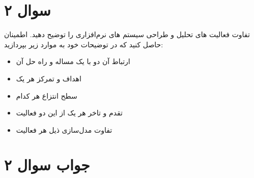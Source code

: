 \section*{سوال ۲}

تفاوت فعالیت های تحلیل و طراحی سیستم های نرم‌افزاری را توضیح دهید. اطمینان حاصل کنید که در توضیحات خود به موارد زیر بپردازید:

\begin{itemize}
	\item ارتباط آن دو با یک مساله و راه حل آن
	\item اهداف و تمرکز هر یک
	\item سطح انتزاع هر کدام
	\item تقدم و تاخر هر یک از این دو فعالیت
	\item تفاوت مدل‌سازی ذیل هر فعالیت
\end{itemize}

\section*{جواب سوال ۲}

